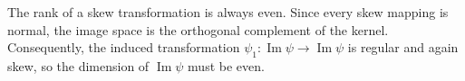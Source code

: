 The rank of a skew transformation is always even. Since every skew mapping is normal, the image space is the orthogonal complement of the kernel. Consequently, the induced transformation $\psi_1: \operatorname{Im} \psi \rightarrow \operatorname{Im} \psi$ is regular and again skew, so the dimension of $\operatorname{Im} \psi$ must be even.
